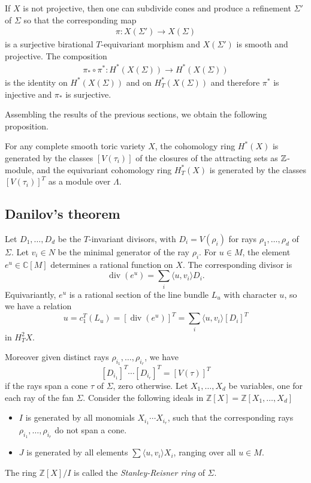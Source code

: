 If $X$ is not projective, then one can subdivide cones and produce
a refinement $\Sigma'$ of $\Sigma$ so that the corresponding map \begin{align*}
	\pi: X(\Sigma') \to X(\Sigma)
\end{align*} is a surjective birational $T$-equivariant morphism and
$X(\Sigma')$ is smooth and projective. The composition \begin{align*}
	\pi_*\circ \pi^*: H^*(X(\Sigma)) \to H^*(X(\Sigma))
\end{align*} is the identity on $H^*(X(\Sigma))$ and on $H^*_T(X(\Sigma))$
and therefore $\pi^*$ is injective and $\pi_*$ is surjective.

Assembling the results of the previous sections, we obtain the following proposition.

\begin{proposition}
	For any complete smooth toric variety $X$, the cohomology ring $H^*(X)$
	is generated by the classes $[V(\tau_i)]$ of the closures of the attracting sets
	as $\mathbb{Z}$-module, and the equivariant cohomology ring $H^*_T(X)$ is generated
	by the classes $[V(\tau_i)]^T$ as a module over $\Lambda$.
\end{proposition}

\subsection{Danilov's theorem}
Let \( D_1, \ldots, D_d \) be the \( T \)-invariant divisors, with \( D_i = V(\rho_i) \) for rays \( \rho_1, \ldots, \rho_d \) of \( \Sigma \). Let \( v_i \in N \) be the minimal generator of the ray \( \rho_i \). For \( u \in M \), the element \( e^u \in \mathbb{C}[M] \) determines a rational function on \( X \). The corresponding divisor is
\[
	\operatorname{div}(e^u) = \sum_i \langle u, v_i \rangle D_i.
\]
Equivariantly, \( e^u \) is a rational section of the line bundle \( L_u \) with character \( u \), so we have a relation
\[
	u = c_1^T(L_u) = \left[\operatorname{div}(e^u)\right]^T = \sum_i \langle u, v_i \rangle [D_i]^T
\]
in \( H_T^2 X \).

Moreover given distinct rays \( \rho_{i_1}, \ldots, \rho_{i_r} \), we have
\[
	[D_{i_1}]^T \cdots [D_{i_r}]^T = [V(\tau)]^T
\]
if the rays span a cone \( \tau \) of \( \Sigma \),  zero otherwise.
Let \( X_1, \ldots, X_d \) be variables, one for each ray of the fan \( \Sigma \). Consider the following ideals
in \( \mathbb{Z}[X] = \mathbb{Z}[X_1, \ldots, X_d] \)
\begin{itemize}
	\item \( I \) is generated by all monomials \( X_{i_1} \cdots X_{i_r} \), such that the corresponding rays \( \rho_{i_1}, \ldots, \rho_{i_r} \) do not span a cone.
	\item \( J \) is generated by all elements \( \sum \langle u, v_i \rangle X_i \), ranging over all \( u \in M \).
\end{itemize}
The ring \( \mathbb{Z}[X] / I \) is called the \emph{Stanley-Reisner ring} of \( \Sigma \).

